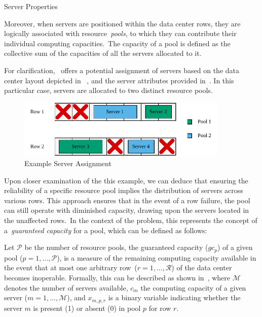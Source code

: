 \begin{table}[ht]
  \centering
  
  \caption{Server Properties}
  \label{tab:dc-example-properties}
\end{table}

Moreover, when servers are positioned within the data center rows, they are
logically associated with resource~\textit{pools}, to which they can contribute
their individual computing capacities.~The capacity of a pool is defined as the
collective sum of the capacities of all the servers allocated to it.

For clarification,~ offers a potential
assignment of servers based on the data center layout depicted in
~, and the server attributes provided
in~. In this particular case, servers are
allocated to two distinct resource pools.

\begin{figure}[h]
  \centering
  \includegraphics[width=0.9\textwidth,keepaspectratio]{../assets/dc/dc-example.pdf}
  \caption{Example Server Assignment}
  \label{fig:data-center-layout-with-servers}
\end{figure}

Upon closer examination of the this example, we can deduce that ensuring the
reliability of a specific resource pool implies the distribution of servers
across various rows. This approach ensures that in the event of a row failure,
the pool can still operate with diminished capacity, drawing upon the servers
located in the unaffected rows.~In the context of the problem, this represents
the concept of a~\textit{guaranteed capacity} for a pool, which can be defined
as follows:

Let $\mathcal{P}$ be the number of resource pools, the guaranteed capacity
($gc_{p}$) of a given pool ($p = 1, \ldots, \mathcal{P}$), is a measure of the
remaining computing capacity available in the event that at most one arbitrary
row~($r = 1, \ldots, \mathcal{R}$) of the data center becomes inoperable.
Formally, this can be described as shown in~, where
$\mathcal{M}$ denotes the number of servers available, $c_{m}$ the computing
capacity of a given server ($m = 1, \ldots, \mathcal{M}$), and $x_{m,p,r}$ is a
binary variable indicating whether the server $m$ is present (1) or absent
(0) in pool $p$ for row $r$.

